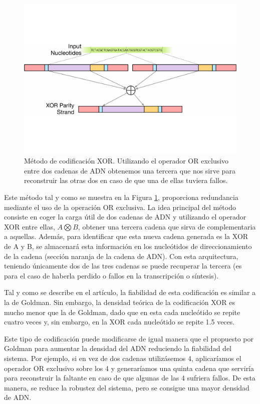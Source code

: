 \documentclass[a4paper,11pt]{article}
\begin{document}
\begin{figure}[h!]
\begin{center}
\includegraphics[width=0.75\linewidth]{xor-coding.pdf}
\caption{Método de codificación XOR. Utilizando el operador OR exclusivo entre dos cadenas de ADN obtenemos una tercera que nos sirve para reconstruir las otras dos en caso de que una de ellas tuviera fallos.}
\label{fig:xorcoding}
\end{center}
\end{figure}

Este método tal y como se muestra en la Figura \ref{fig:xorcoding}, proporciona redundancia mediante el uso de la operación OR exclusiva. La idea principal del método consiste en coger la carga útil de dos cadenas de ADN y utilizando el operador XOR entre ellas, \(A \bigotimes B\), obtener una tercera cadena que sirva de complementaria a aquellas. Además, para identificar que esta nueva cadena generada es la XOR de A y B, se almacenará esta información en los nucleótidos de direccionamiento de la cadena (sección naranja de la cadena de ADN). Con esta arquitectura, teniendo únicamente dos de las tres cadenas se puede recuperar la tercera (es para el caso de haberla perdido o fallos en la transcripción o síntesis).

Tal y como se describe en el artículo, la fiabilidad de esta codificación es similar a la de Goldman. Sin embargo, la densidad teórica de la codificación XOR es mucho menor que la de Goldman, dado que en esta cada nucleótido se repite cuatro veces y, sin embargo, en la XOR cada nucleótido se repite 1.5 veces.

Este tipo de codificación puede modificarse de igual manera que el propuesto por Goldman para aumentar la densidad del ADN reduciendo la fiabilidad del sistema. Por ejemplo, si en vez de dos cadenas utilizásemos 4, aplicaríamos el operador OR exclusivo sobre los 4 y generaríamos una quinta cadena que serviría para reconstruir la faltante en caso de que algunas de las 4 sufriera fallos. De esta manera, se reduce la robustez del sistema, pero se consigue una mayor densidad de ADN.
\end{document}

